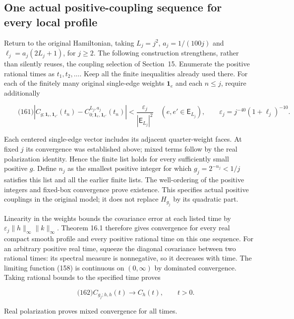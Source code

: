 \subsection{One actual positive-coupling sequence for every local
profile}\label{full-local-spectrum-md-one-actual-positive-coupling-sequence-for-every-local-profile}

Return to the original Hamiltonian, taking \(L_j=j^2\), \(a_j=1/(100j)\)
and \(\ell_j=a_j(2L_j+1)\), for \(j\ge2\). The following construction
strengthens, rather than silently reuses, the coupling selection of
Section~15. Enumerate the positive rational times as \(t_1,t_2,\ldots\).
Keep all the finite inequalities already used there. For each of the
finitely many original single-edge weights \(\mathbf1_e\) and each
\(n\le j\), require additionally

\[
\qquad\text{(161)}
 \left|C_{g;\mathbf1_e,\mathbf1_{e'}}(t_n)
       -C_{0;\mathbf1_e,\mathbf1_{e'}}^{L_j,a_j}(t_n)\right|
       <\frac{\varepsilon_j}{|\mathsf E_{L_j}|^2}
 \quad(e,e'\in\mathsf E_{L_j}),\qquad
 \varepsilon_j=j^{-40}(1+\ell_j)^{-10}.
\]

Each centered single-edge vector includes its adjacent quarter-weight
faces. At fixed \(j\) its convergence was established above; mixed terms
follow by the real polarization identity. Hence the finite list holds
for every sufficiently small positive \(g\). Define \(n_j\) as the
smallest positive integer for which \(g_j=2^{-n_j}<1/j\) satisfies this
list and all the earlier finite lists. The well-ordering of the positive
integers and fixed-box convergence prove existence. This specifies
actual positive couplings in the original model; it does not replace
\(H_{g_j}\) by its quadratic part.

Linearity in the weights bounds the covariance error at each listed time
by \(\varepsilon_j\|h\|_\infty\|k\|_\infty\). Theorem 16.1 therefore
gives convergence for every real compact smooth profile and every
positive rational time on this one sequence. For an arbitrary positive
real time, squeeze the diagonal covariance between two rational times:
its spectral measure is nonnegative, so it decreases with time. The
limiting function (158) is continuous on \((0,\infty)\) by dominated
convergence. Taking rational bounds to the specified time proves

\[
\qquad\text{(162)}
 C_{g_j;h,h}(t)\longrightarrow C_h(t),\qquad t>0.
\]

Real polarization proves mixed convergence for all times.

